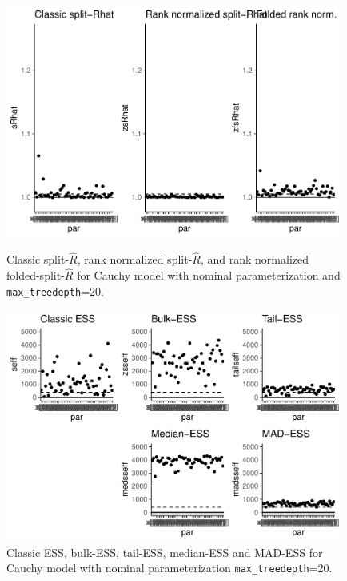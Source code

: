 \documentclass[american,]{article}
\theoremstyle{definition}
\begin{document}
\begin{figure}[tp]
  \centering
  \begin{minipage}{0.48\textwidth}
  \includegraphics[width=0.98\textwidth]{graphics/rhat-fit-nom-td20-1.pdf}
  \caption{Classic split-\(\widehat{R}\), rank normalized
    split-\(\widehat{R}\), and rank normalized
    folded-split-\(\widehat{R}\) for Cauchy model with nominal
    parameterization and \texttt{max\_treedepth}=20.}
  \label{fig:rhat-fit-nom-td20-1}
\end{minipage}
\hfill
  \begin{minipage}{0.48\textwidth}
  \includegraphics[width=0.98\textwidth]{graphics/ess-fit-nom-td20-1.pdf}
  \caption{Classic ESS, bulk-ESS, tail-ESS, median-ESS and MAD-ESS for
    Cauchy model with nominal parameterization \texttt{max\_treedepth}=20.}
  \label{fig:ess-fit-nom-td20-1}
\end{minipage}
\end{figure}
\end{document}
